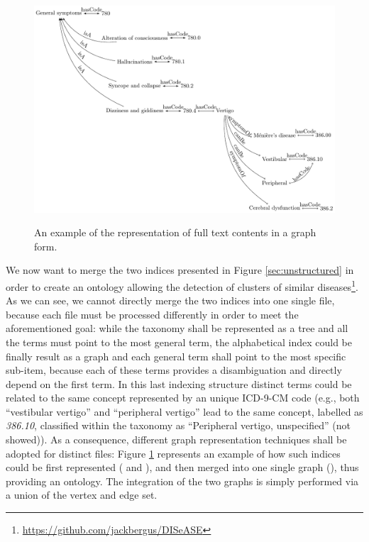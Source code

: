 \begin{figure}
	
	\begin{minipage}[t]{\textwidth}
		\includegraphics[width=\textwidth]{fig/01dataint/04_fromfulltext03.pdf}
		\label{fig:astaxonomy2}
	\end{minipage}
	\caption{An example of the representation of full text contents in a graph form.}
	\label{fig:mergedgraphsfromfull}
\end{figure}
\begin{example}
  We now want to merge the two indices presented in Figure \ref{sec:unstructured} in order to create an ontology allowing the detection of clusters of similar diseases\footnote{\url{https://github.com/jackbergus/DISeASE}}. As we can see, we cannot directly merge the two indices into one single file, because each file must be processed differently in order to meet the aforementioned goal: while the taxonomy shall be represented as a tree and all the terms must point to the most general term, the alphabetical index could be finally result as a graph and each general term shall point to the most specific sub-item, because each of these terms provides a disambiguation and directly depend on the first term. In this last indexing structure distinct terms could be related to the same concept represented by an unique ICD-9-CM code (e.g., both ``vestibular vertigo'' and ``peripheral vertigo'' lead to the same concept, labelled as \textit{386.10}, classified within the taxonomy as ``Peripheral vertigo, unspecified'' (not showed)). As a consequence, different graph representation techniques shall be adopted for distinct files: Figure \ref{fig:mergedgraphsfromfull} represents an example of how such indices could be first represented ( and ), and then merged into one single graph (), thus providing an ontology. The integration of the two graphs is simply performed via a union of the vertex and edge set.
\end{example}


